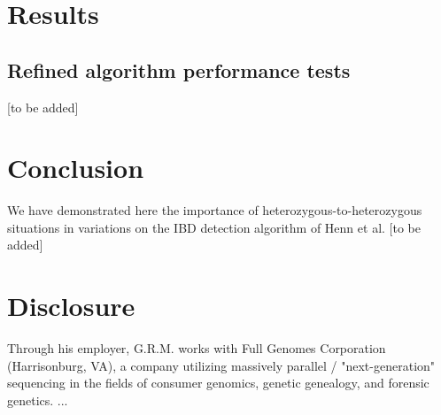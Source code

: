 \documentclass{article}
\begin{document}
\section{Results}
\subsection{Refined algorithm performance tests}
[to be added]

\section{Conclusion}
We have demonstrated here the importance of heterozygous-to-heterozygous situations in variations on the IBD detection algorithm of Henn et al. [to be added] 

\section{Disclosure}
Through his employer, G.R.M. works with Full Genomes Corporation (Harrisonburg, VA), a company utilizing massively parallel / "next-generation" sequencing in the fields of consumer genomics, genetic genealogy, and forensic genetics.
...



\end{document}
